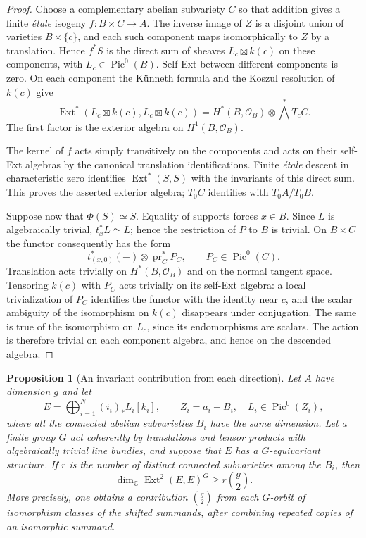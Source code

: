 \documentclass[11pt]{article}
\newtheorem{proposition}[theorem]{Proposition}
\theoremstyle{definition}
\theoremstyle{remark}
\begin{document}
\begin{proof}
Choose a complementary abelian subvariety $C$ so that addition gives
a finite \emph{\'etale} isogeny
$f:B\times C\longrightarrow A$.  The inverse image of $Z$ is a
disjoint union of varieties $B\times\{c\}$, and each such component
maps isomorphically to $Z$ by a translation.  Hence $f^*S$ is the
direct sum of sheaves $L_c\boxtimes k(c)$ on these components, with
$L_c\in\operatorname{Pic}^0(B)$.  Self-Ext between different
components is zero.  On each component the K\"unneth formula and
the Koszul resolution of $k(c)$ give
\[
 \operatorname{Ext}^*(L_c\boxtimes k(c),L_c\boxtimes k(c))
 =H^*(B,\mathcal O_B)\otimes\bigwedge^*T_cC.
\]
The first factor is the exterior algebra on $H^1(B,\mathcal O_B)$.

The kernel of $f$ acts simply transitively on the components and
acts on their self-Ext algebras by the canonical translation
identifications.  Finite \emph{\'etale} descent in characteristic
zero identifies $\operatorname{Ext}^*(S,S)$ with the invariants of
this direct sum.  This proves the asserted exterior algebra;
$T_0C$ identifies with $T_0A/T_0B$.

Suppose now that $\Phi(S)\simeq S$.  Equality of supports forces
$x\in B$.  Since $L$ is algebraically trivial,
$t_x^*L\simeq L$; hence the restriction of $P$ to $B$ is trivial.
On $B\times C$ the functor consequently has the form
\[
 t_{(x,0)}^*(-)\otimes\operatorname{pr}_C^*P_C,
 \qquad P_C\in\operatorname{Pic}^0(C).
\]
Translation acts trivially on $H^*(B,\mathcal O_B)$ and on the
normal tangent space.  Tensoring $k(c)$ with $P_C$ acts trivially
on its self-Ext algebra: a local trivialization of $P_C$ identifies
the functor with the identity near $c$, and the scalar ambiguity
of the isomorphism on $k(c)$ disappears under conjugation.
The same is true of the isomorphism on $L_c$, since its endomorphisms
are scalars.  The action is therefore trivial on each component
algebra, and hence on the descended algebra.
\end{proof}

\begin{proposition}[An invariant contribution from each direction]
\label{prop:subtorus-orbit-ext}
Let $A$ have dimension $g$ and let
\[
 E=\bigoplus_{i=1}^N (i_i)_*L_i[k_i],
 \qquad Z_i=a_i+B_i,\quad L_i\in\operatorname{Pic}^0(Z_i),
\]
where all the connected abelian subvarieties $B_i$ have the same
dimension.  Let a finite group $G$ act coherently by translations
and tensor products with algebraically trivial line bundles, and
suppose that $E$ has a $G$-equivariant structure.
If $r$ is the number of distinct connected subvarieties among the
$B_i$, then
\[
 \dim_{\mathbb C}\operatorname{Ext}^2(E,E)^G\geq r\binom g2.
\]
More precisely, one obtains a contribution $\binom g2$ from each
$G$-orbit of isomorphism classes of the shifted summands, after
combining repeated copies of an isomorphic summand.
\end{proposition}
\end{document}
